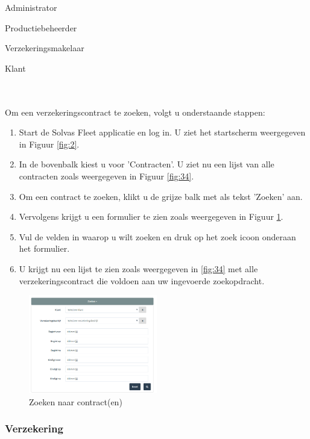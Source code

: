 \documentclass[11pt,openany]{article}
\newcommand{\cmark}{\ding{51}}%
\newcommand{\done}{\rlap{$\square$}{\raisebox{2pt}{\large\hspace{1pt}\cmark}}%
	\hspace{-2.5pt}}
\begin{document}
\begin{todolist}
	\item[\done] Administrator
	\item[\done] Productiebeheerder
	\item[\done] Verzekeringsmakelaar
	\item[\done] Klant 
\end{todolist}
\\
\\
Om een verzekeringscontract te zoeken, volgt u onderstaande stappen:
\begin{enumerate}
	\item Start de Solvas Fleet applicatie en log in. U ziet het startscherm weergegeven in Figuur \ref{fig:2}.
	\item In de bovenbalk kiest u voor 'Contracten'. U ziet nu een lijst van alle contracten zoals weergegeven in Figuur \ref{fig:34}.
	\item Om een contract te zoeken, klikt u de grijze balk met als tekst 'Zoeken' aan. 
	\item Vervolgens krijgt u een formulier te zien zoals weergegeven in Figuur \ref{fig:41}.
	\item Vul de velden in waarop u wilt zoeken en druk op het zoek icoon onderaan het formulier.
	\item U krijgt nu een lijst te zien zoals weergegeven in \ref{fig:34} met alle verzekeringscontract die voldoen aan uw ingevoerde zoekopdracht.
\end{enumerate}

\begin{figure}
	\centering
	\includegraphics[width=0.5\textwidth]{img/fig41.png}
	\caption{Zoeken naar contract(en)} 
	\label{fig:41} 
\end{figure}
\newpage
\subsubsection{Verzekering}
\label{vehicle_insurance}
\end{document}

